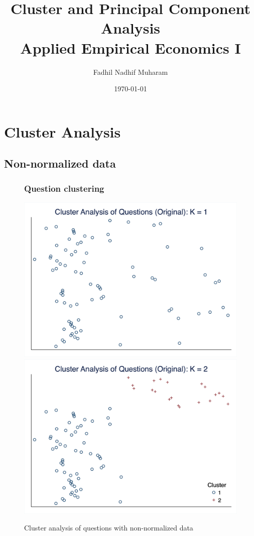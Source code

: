 \documentclass[10pt,leqno]{article}
\title{Cluster and Principal Component Analysis\\
Applied Empirical Economics I}
\author{Fadhil Nadhif Muharam}
\date{\today}
\begin{document}
\maketitle

\section{Cluster Analysis}
\subsection{Non-normalized data}
\begin{figure}  [h!]
\subsubsection{Question clustering}
\begin{center}
\caption{Cluster analysis of questions with non-normalized data}
\includegraphics[scale=0.15]{CA_QuestionK1_ORI.png}
\includegraphics[scale=0.15]{CA_QuestionK2_ORI.png}

\end{center}
\end{figure}
\end{document}
